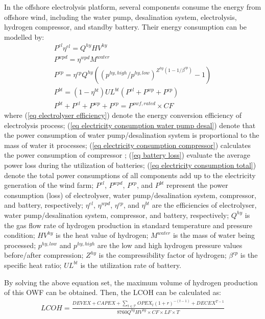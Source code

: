 \documentclass[sn-mathphys,Numbered]{sn-jnl}%
\theoremstyle{thmstyleone}%
\theoremstyle{thmstyletwo}%
\theoremstyle{thmstylethree}%
\begin{document}
In the offshore electrolysis platform, several components consume the energy from offshore wind, including the water pump, desalination system, electrolysis, hydrogen compressor, and standby battery. Their energy consumption can be modelled by:
\begin{gather}
    P^{el} \eta^{el} = Q^{hy} HV^{hy}
\label{eq electrolyser efficiency} \\
    P^{wpd} = \eta^{wpd} M^{water}
\label{eq electricity consumption water pump desal}    \\
    P^{cp} = \eta^{cp} Q^{hy} \left( (p^{hy,high}/p^{hy,low})^{Z^{hy}(1-1/\beta^{cp})}-1 \right)
\label{eq electricity consumption compressor}    \\
    P^{bt} = (1-\eta^{bt}) UL^{bt} (P^{el} + P^{wp} + P^{cp})
\label{eq battery loss}    \\
    P^{bt} + P^{el} + P^{wp} + P^{cp} = P^{owf,rated} \times CF
\label{eq electricity consumption total}
\end{gather}
where (\ref{eq electrolyser efficiency}) denote the energy conversion efficiency of electrolysis process;  (\ref{eq electricity consumption water pump desal}) denote that the power consumption of water pump/desalination system is proportional to the mass of water it processes; (\ref{eq electricity consumption compressor}) calculates the power consumption of compressor \cite{bao2019multi}; (\ref{eq battery loss}) evaluate the average power loss during the utilization of batteries; (\ref{eq electricity consumption total}) denote the total power consumptions of all components add up to the electricity generation of the wind farm; $P^{el}$, $P^{wpd}$, $P^{cp}$, and $P^{bt}$ represent the power consumption (loss) of electrolyser, water pump/desalination system, compressor, and battery, respectively; $\eta^{el}$, $\eta^{wpd}$, $\eta^{cp}$, and $\eta^{bt}$ are the efficiencies of electrolyser, water pump/desalination system, compressor, and battery, respectively; $Q^{hy}$ is the gas flow rate of hydrogen production in standard temperature and pressure condition; $HV^{hy}$ is the heat value of hydrogen; $M^{water}$ is the mass of water being processed; $p^{hy,low}$ and $p^{hy,high}$ are the low and high hydrogen pressure values before/after compression; $Z^{hy}$ is the compressibility factor of hydrogen; $\beta^{cp}$ is the specific heat ratio; $UL^{bt}$ is the utilization rate of battery.

By solving the above equation set, the maximum volume of hydrogen production of this OWF can be obtained. Then, the LCOH can be calculated as:
\begin{gather}
    LCOH = \frac{DEVEX + CAPEX + \sum_{t \in \mathcal{T}} OPEX_t (1+r)^{-(t-1)} + DECEX^{T-1}}
   {8760 Q^{hy} HV^{hy} \times CF \times LF \times T}
\end{gather}
\end{document}
